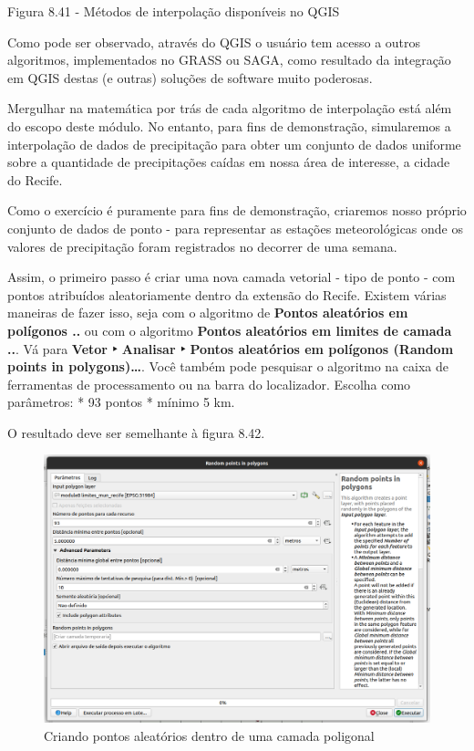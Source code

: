 \documentclass[
]{book}
\begin{document}
Figura 8.41 - Métodos de interpolação disponíveis no QGIS

Como pode ser observado, através do QGIS o usuário tem acesso a outros algoritmos, implementados no GRASS ou SAGA, como resultado da integração em QGIS destas (e outras) soluções de software muito poderosas.

Mergulhar na matemática por trás de cada algoritmo de interpolação está além do escopo deste módulo. No entanto, para fins de demonstração, simularemos a interpolação de dados de precipitação para obter um conjunto de dados uniforme sobre a quantidade de precipitações caídas em nossa área de interesse, a cidade do Recife.

Como o exercício é puramente para fins de demonstração, criaremos nosso próprio conjunto de dados de ponto - para representar as estações meteorológicas onde os valores de precipitação foram registrados no decorrer de uma semana.

Assim, o primeiro passo é criar uma nova camada vetorial - tipo de ponto - com pontos atribuídos aleatoriamente dentro da extensão do Recife. Existem várias maneiras de fazer isso, seja com o algoritmo de \textbf{Pontos aleatórios em polígonos ..} ou com o algoritmo \textbf{Pontos aleatórios em limites de camada ..}. Vá para \textbf{Vetor ‣ Analisar ‣ Pontos aleatórios em polígonos (Random points in polygons)\ldots{}}. Você também pode pesquisar o algoritmo na caixa de ferramentas de processamento ou na barra do localizador. Escolha como parâmetros:
* 93 pontos
* mínimo 5 km.

O resultado deve ser semelhante à figura 8.42.

\begin{figure}
\centering
\includegraphics{media/modulo8/fig842.png}
\caption{Criando pontos aleatórios dentro de uma camada poligonal}
\end{figure}
\end{document}
